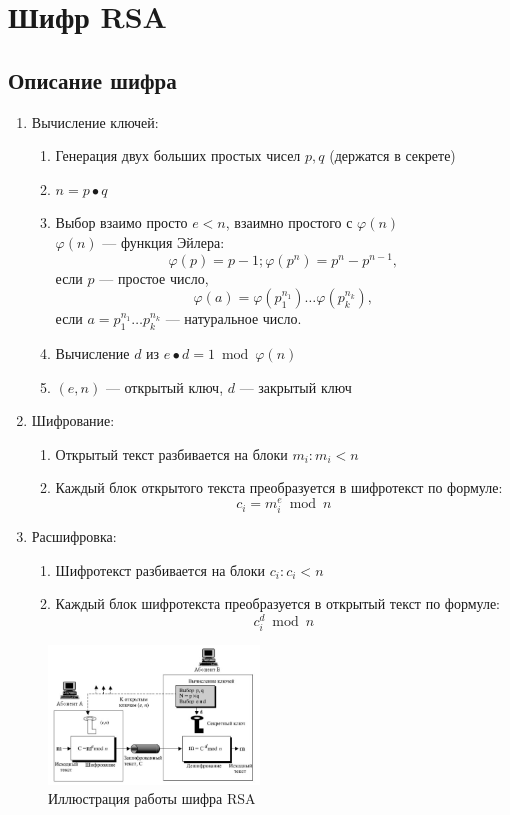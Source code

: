 \documentclass[a4paper, 14pt]{extarticle}
\begin{document}
\section{Шифр RSA}
\subsection{Описание шифра}
\begin{enumerate}
    \item Вычисление ключей:
        \begin{enumerate}
            \item Генерация двух больших простых чисел $p, q$ (держатся в секрете)
            \item $n = p \bullet q$
            \item Выбор взаимо просто $e < n$, взаимно простого с $\varphi(n)$\\
                $\varphi(n)$ --- функция Эйлера:
                \[ \varphi(p) = p - 1; \varphi(p^n) = p^n - p^{n-1}, \]
                если $p$ --- простое число,
                \[ \varphi(a) = \varphi(p_1^{n_1}) \ldots \varphi(p_k^{n_k}), \]
                если $a = p_1^{n_1} \ldots p_k^{n_k}$ --- натуральное число.
            \item Вычисление $d$ из $e \bullet d = 1 \bmod \varphi(n)$
            \item $(e,n)$ --- открытый ключ, $d$ --- закрытый ключ
        \end{enumerate}
    \item Шифрование:
        \begin{enumerate}
            \item Открытый текст разбивается на блоки $m_i: m_i < n$
            \item Каждый блок открытого текста преобразуется в шифротекст по формуле:
                \[ c_i = m_i^e \bmod n \]
        \end{enumerate}
    \item Расшифровка:
        \begin{enumerate}
            \item Шифротекст разбивается на блоки $c_i: c_i < n$
            \item Каждый блок шифротекста преобразуется в открытый текст по формуле:
                \[ c_i^d \bmod n \]
        \end{enumerate}
\end{enumerate}
\begin{figure}[h]
    \centering
    \includegraphics[width=0.5\textwidth]{img/S003.jpg}
    \caption{Иллюстрация работы шифра RSA}%
    \label{img:b:1}
\end{figure}
\end{document}
